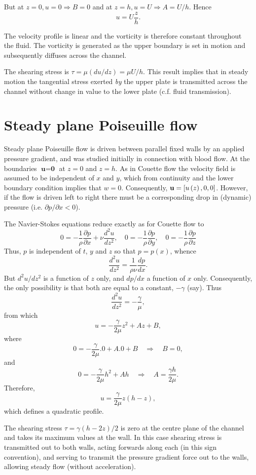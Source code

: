 \documentclass[10pt]{report}
\begin{document}
But at $z=0,u=0\Rightarrow
B=0$ and at $z=h,u=U\Rightarrow
A=U/h$.
Hence
\[ u=U\frac{z}{h}. \]

The velocity profile is linear and the vorticity is therefore constant
throughout the fluid. The vorticity is generated as the upper boundary is
set in motion and subsequently diffuses across the channel.

The shearing stress is $\tau =\mu \left( {{du} /{dz}}
\right)=\mu U / h$. This result implies that in steady motion
the tangential stress exerted \textit{by} the upper plate is transmitted across the
channel without change in value to the lower plate (c.f. fluid transmission).

\section{Steady plane Poiseuille flow}
Steady plane Poiseuille flow is driven between parallel fixed walls by an
applied pressure gradient, and was studied initially in connection with
blood flow. At the boundaries $\textbf{u} = \textbf{0}$ at $z = 0$ and $z = h$. As
in Couette flow the velocity field is assumed to be independent of $x$ and $y$,
which from continuity and the lower boundary condition implies that $w = 0$.
Consequently, ${{\bf u}}=\left[ {u\left( z \right),0,0} \right]$.
However, if the flow is driven left to right there must be a corresponding
drop in (dynamic) pressure (i.e. $\partial p/\partial x <0$).

The Navier-Stokes equations reduce exactly as for Couette flow to
\[
0=-\frac{1}{\rho }\frac{\partial p}{\partial x}+\nu
\frac{d^2u}{dz^2},\quad 0=-\frac{1}{\rho }\frac{\partial
p}{\partial y},\quad 0=-\frac{1}{\rho }\frac{\partial
p}{\partial z}
\]
Thus, $p$ is independent of $t$, $y$ and $z$ so that $p = p(x)$, whence
\[
\frac{d^2u}{dz^2}=\frac{1}{\rho \nu }\frac{dp}{dx}.
\]
But ${d^2u} /  {dz^2}$ is a function of $z$ only, and ${dp} / {dx}$ a function of $x$ only. Consequently, the only possibility is that both
are equal to a constant, $-\gamma $ (say). Thus
\[
\frac{d^2u}{dz^2}=-\frac{\gamma }{\mu },
\]
from which
\[ u=-\frac{\gamma }{2\mu }z^2+Az+B, \]
where
\[ 0=-\frac{\gamma }{2\mu }. 0+A.
0+B \quad \Rightarrow \quad B=0, \]
and
\[ 0=-\frac{\gamma }{2\mu
}h^2+Ah \quad \Rightarrow \quad A=\frac{\gamma h}{2\mu }. \]
Therefore,
\[ u=\frac{\gamma }{2\mu }z(h-z), \]
which defines a quadratic profile.

The shearing stress $\tau ={\gamma (h-2z)} / 2$
is zero at the centre plane of the channel and takes its maximum values at
the wall. In this case shearing stress is transmitted out to both walls,
acting forwards along each (in this sign convention), and
serving to transmit the pressure gradient force out to the walls,
allowing steady flow (without acceleration).
\end{document}
